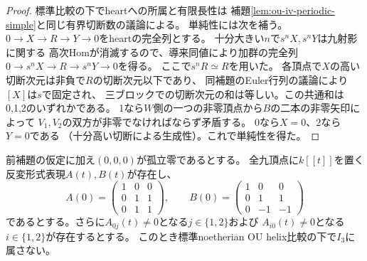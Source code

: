 \begin{proof}
標準比較の下でheartへの所属と有限長性は
補題\ref{lem:ou-iv-periodic-simple}と同じ有界切断数の議論による。
単純性には次を補う。$0\to X\to R\to Y\to0$をheartの完全列とする。
十分大きい$n$で$s^nX,s^nY$は九射影に関する
高次Homが消滅するので、導来同値により加群の完全列
$0\to s^nX\to R\to s^nY\to0$を得る。
ここで$s^nR\simeq R$を用いた。
各頂点で$X$の高い切断次元は非負で$R$の切断次元以下であり、
同補題のEuler行列の議論により$[X]$は$s$で固定され、
三ブロックでの切断次元の和は等しい。この共通和は0,1,2のいずれかである。
1なら$W$側の一つの非零頂点から$B$の二本の非零矢印によって
$V_1,V_2$の双方が非零でなければならず矛盾する。
0なら$X=0$、2なら$Y=0$である
（十分高い切断による生成性）。これで単純性を得た。
\end{proof}

\begin{proposition}[補集合との形式厚化による内在的排除]
\label{prop:ou-complement-arc-obstruction}
前補題の仮定に加え$(0,0,0)$が孤立零であるとする。
全九頂点に$k[[t]]$を置く反変形式表現$A(t),B(t)$が存在し、
\[
 A(0)=\begin{pmatrix}1&0&0\\0&1&1\\0&1&1\end{pmatrix},\qquad
 B(0)=\begin{pmatrix}1&0&0\\0&1&1\\0&-1&-1\end{pmatrix}
\]
であるとする。さらに$A_{0j}(t)\ne0$となる$j\in\{1,2\}$および
$A_{i0}(t)\ne0$となる$i\in\{1,2\}$が存在するとする。
このとき標準noetherian OU helix比較の下で$I_3$に属さない。
\end{proposition}
